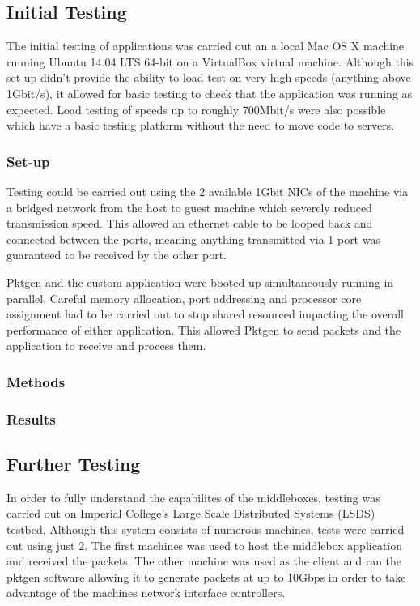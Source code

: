 \documentclass[final_report.tex]{subfiles}
\begin{document}
\subsection{Initial Testing}
The initial testing of applications  was carried out an a local Mac OS X machine running Ubuntu 14.04 LTS 64-bit on a VirtualBox  virtual machine. Although this set-up didn't provide the ability to load test on very high speeds (anything above 1Gbit/s), it allowed for basic testing to check that the application was running as expected. Load testing of speeds up to roughly 700Mbit/s were also possible which have a basic testing platform without the need to move code to servers.

\subsubsection{Set-up}
Testing could be carried out using the 2 available 1Gbit NICs of the machine via a bridged network from the host to guest machine which severely reduced transmission speed. This allowed an ethernet cable to be looped back and connected between the ports, meaning anything transmitted via 1 port was guaranteed to be received by the other port.

Pktgen and the custom application were booted up simultaneously running in parallel. Careful memory allocation, port addressing and processor core assignment had to be carried out to stop shared resourced impacting the overall performance of either application. This allowed Pktgen to send packets and the application to receive and process them.

\subsubsection{Methods}

\subsubsection{Results}

\subsection{Further Testing}
In order to fully understand the capabilites of the middleboxes, testing was carried out on Imperial College's Large Scale Distributed Systems (LSDS) testbed. Although this system consists of numerous machines, tests were carried out using just 2. The first machines was used to host the middlebox application and received the packets. The other machine was used as the client and ran the pktgen software allowing it to generate packets at up to 10Gbps in order to take advantage of the machines network interface controllers.
\end{document}
